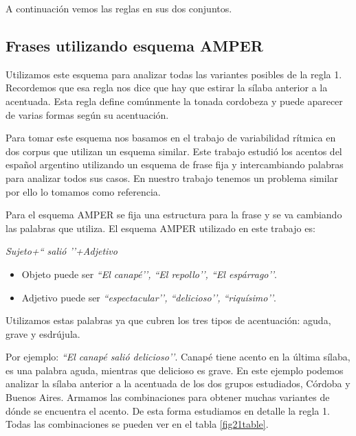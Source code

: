 A continuación vemos las reglas en sus dos conjuntos.

\subsection{Frases utilizando esquema AMPER} \label{cap:amper}


Utilizamos este esquema para analizar todas las variantes posibles de la regla 1. Recordemos que esa regla nos dice que hay que estirar la sílaba anterior a la acentuada. Esta regla define comúnmente la tonada cordobeza y puede aparecer de varias formas según su acentuación. 

Para tomar este esquema nos basamos en el trabajo de variabilidad rítmica en dos corpus \cite{amper} que utilizan un esquema similar. Este trabajo estudió los acentos del español argentino utilizando un esquema de frase fija y intercambiando palabras para analizar todos sus casos. En nuestro trabajo tenemos un problema similar por ello lo tomamos como referencia.

Para el esquema AMPER se fija una estructura para la frase y se va cambiando las palabras que utiliza. El esquema AMPER utilizado en este trabajo es: 
\begin{center}
\textit{Sujeto+`` salió ’’+Adjetivo} 
\end{center}

\begin{itemize}
	\item Objeto puede ser \textit{``El canapé’’, ``El repollo’’, ``El espárrago’’}.
	\item Adjetivo puede ser \textit{``espectacular’’, ``delicioso’’, ``riquísimo’’}.
\end{itemize}

Utilizamos estas palabras ya que cubren los tres tipos de acentuación: aguda, grave y esdrújula. 

Por ejemplo: \textit{``El canapé salió delicioso’’}. Canapé tiene acento en la última sílaba, es una palabra aguda, mientras que delicioso es grave. En este ejemplo podemos analizar la sílaba anterior a la acentuada de los dos grupos estudiados, Córdoba y Buenos Aires. Armamos las combinaciones para obtener muchas variantes de dónde se encuentra el acento. De esta forma estudiamos en detalle la regla 1. Todas las combinaciones se pueden ver en el tabla \ref{fig21table}.

